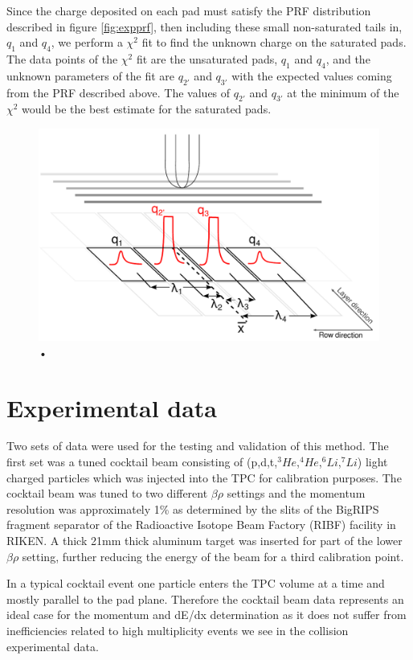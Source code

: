 \documentclass[review]{elsarticle}
\begin{document}
Since the charge deposited on each  pad must satisfy the PRF distribution described in figure \ref{fig:expprf}, then including these small non-saturated tails in, $q_{1}$ and $q_{4}$, we perform a $\chi^2$ fit to find the unknown charge on the saturated pads. The data points of the $\chi^2$ fit are the unsaturated pads,  $q_{1}$ and $q_{4}$, and the unknown parameters of the fit are $q_{2'}$ and $q_{3'}$ with the expected values coming from the PRF described above. The values of $q_{2'}$ and $q_{3'}$ at the minimum of the $\chi^2$ would be the best estimate for the saturated pads. 
\begin{figure}[H]
\includegraphics[width=\linewidth]{saturated_pads}
\caption{•}
\label{fig:satpad}
\end{figure}

\section{Experimental data}
Two sets of data were used for the testing and validation of this method. The first set was a tuned cocktail beam consisting of (p,d,t,${}^3He$,${}^4He$,${}^6Li$,${}^7Li$) light charged particles which was injected into the TPC for calibration purposes. The cocktail beam was tuned to two different $\beta\rho$ settings and the momentum resolution was approximately 1\% as determined by the slits of the BigRIPS fragment separator of the Radioactive Isotope Beam Factory (RIBF) facility in RIKEN. A thick 21mm thick aluminum target was inserted for part of the lower $\beta\rho$ setting, further reducing the energy of the beam for a third calibration point. 

In a typical cocktail event one particle enters the TPC volume at a time and mostly parallel to the pad plane. Therefore the cocktail beam data represents an ideal case for the momentum and dE/dx determination as it does not suffer from inefficiencies related to high multiplicity events we see in the collision experimental data.  
\end{document}
